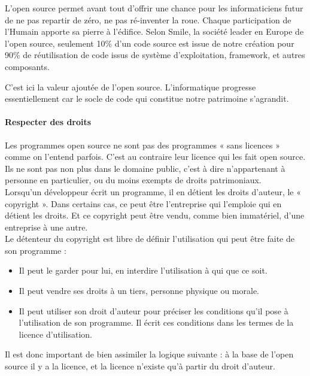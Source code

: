 					L'open source permet avant tout d'offrir une chance pour les informaticiens futur de ne pas repartir de zéro, ne pas ré-inventer la roue. Chaque participation de l'Humain apporte sa pierre à l'édifice.
					Selon Smile, la société leader en Europe de l'open source, seulement 10\% d'un code source est issue de notre création pour 90\% de réutilisation de code issus de système d'exploitation, \gls{framework}, et autres composants.

					C'est ici la valeur ajoutée de l'open source. L'informatique progresse essentiellement car le socle de code qui constitue notre patrimoine s'agrandit.

				\paragraph{Respecter des droits\\}

					Les programmes open source ne sont pas des programmes « sans licences » comme on l'entend parfois. C'est au contraire leur licence qui les fait open source. Ils ne sont pas non plus dans le domaine public, c'est à dire n'appartenant à personne en particulier, ou du moins exempts de droits patrimoniaux.\\
					Lorsqu'un développeur écrit un programme, il en détient les droits d'auteur, le « copyright ». Dans certains cas, ce peut être l'entreprise qui l'emploie qui en détient les droits. Et ce copyright peut être vendu, comme bien immatériel, d'une entreprise à une autre. \\

					Le détenteur du copyright est libre de définir l'utilisation qui peut être faite de son programme : 

					\begin{itemize}[label=\textbullet, font=\LARGE \color{burntorange}]
						\item Il peut le garder pour lui, en interdire l'utilisation à qui que ce soit.
						\item Il peut vendre ses droits à un tiers, personne physique ou morale.
						\item Il peut utiliser son droit d'auteur pour préciser les conditions qu'il pose à l'utilisation de son programme. Il écrit ces conditions dans les termes de la licence d'utilisation.
					\end{itemize}
				
					Il est donc important de bien assimiler la logique suivante : à la base de l'open source il y a la licence, et la licence n'existe qu'à partir du droit d'auteur.\\

